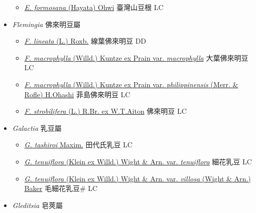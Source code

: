 \begin{itemize}
  \begin{itemize}
        \item[] \href{http://www.theplantlist.org/tpl1.1/search?q=Euchresta+formosana}{\textit{E. formosana} (Hayata) Ohwi}   臺灣山豆根 LC
  \end{itemize}
 \item[] \textit{Flemingia} 佛來明豆屬
                    
  \begin{itemize}
        \item[] \href{http://www.theplantlist.org/tpl1.1/search?q=Flemingia+lineata}{\textit{F. lineata} (L.) Roxb.}   線葉佛來明豆 DD
        \item[] \href{http://www.theplantlist.org/tpl1.1/search?q=Flemingia+macrophylla+var.+macrophylla}{\textit{F. macrophylla} (Willd.) Kuntze ex Prain var. \textit{macrophylla}}   大葉佛來明豆 LC
        \item[] \href{http://www.theplantlist.org/tpl1.1/search?q=Flemingia+macrophylla+var.+philippinensis}{\textit{F. macrophylla} (Willd.) Kuntze ex Prain var. \textit{philippinensis} (Merr. \& Rofle) H.Ohashi}   菲島佛來明豆 LC
        \item[] \href{http://www.theplantlist.org/tpl1.1/search?q=Flemingia+strobilifera}{\textit{F. strobilifera} (L.) R.Br. ex W.T.Aiton}   佛來明豆 LC
  \end{itemize}
 \item[] \textit{Galactia} 乳豆屬
                    
  \begin{itemize}
        \item[] \href{http://www.theplantlist.org/tpl1.1/search?q=Galactia+tashiroi}{\textit{G. tashiroi} Maxim.}   田代氏乳豆 LC
        \item[] \href{http://www.theplantlist.org/tpl1.1/search?q=Galactia+tenuiflora+var.+tenuiflora}{\textit{G. tenuiflora} (Klein ex Willd.) Wight \& Arn. var. \textit{tenuiflora}}   細花乳豆 LC
        \item[] \href{http://www.theplantlist.org/tpl1.1/search?q=Galactia+tenuiflora+var.+villosa}{\textit{G. tenuiflora} (Klein ex Willd.) Wight \& Arn. var. \textit{villosa} (Wight \& Arn.) Baker}   毛細花乳豆\# LC
  \end{itemize}
 \item[] \textit{Gleditsia} 皂莢屬
                    

\end{itemize}
